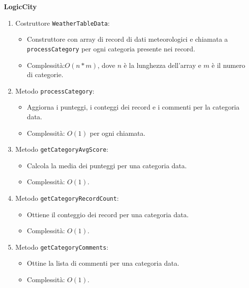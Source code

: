 \textbf{LogicCity}
\begin{enumerate}
    \item Costruttore \texttt{WeatherTableData}:
    \begin{itemize}
        \item Construttore con array di record di dati meteorologici e chiamata a \texttt{processCategory} per ogni categoria presente nei record.
        \item Complessità:$O(n*m)$, dove $n$ è la lunghezza dell'array e $m$ è il numero di categorie.
    \end{itemize}
    \item Metodo \texttt{processCategory}:
    \begin{itemize}
        \item Aggiorna i punteggi, i conteggi dei record e i commenti per la categoria data.
        \item Complessità: $O(1)$ per ogni chiamata.
    \end{itemize}
    \item Metodo \texttt{getCategoryAvgScore}:
    \begin{itemize}
        \item Calcola la media dei punteggi per una categoria data.
        \item Complessità: $O(1)$.
    \end{itemize}
    \item Metodo \texttt{getCategoryRecordCount}:
    \begin{itemize}
        \item Ottiene il conteggio dei record per una categoria data.
        \item Complessità: $O(1)$.
    \end{itemize}
    \item Metodo \texttt{getCategoryComments}:
    \begin{itemize}
        \item Ottine la lista di commenti per una categoria data.
        \item Complessità: $O(1)$.
    \end{itemize}
\end{enumerate}

